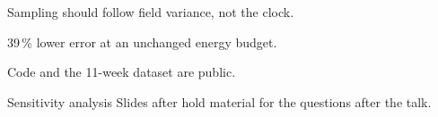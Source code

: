 \documentclass[aspectratio=169,10pt]{beamer}
\begin{document}
\begin{closing}
  \item Sampling should follow field variance, not the clock.
  \item 39\,\% lower error at an unchanged energy budget.
  \item Code and the 11-week dataset are public.
\end{closing}

\thbbackup
\begin{frame}{Sensitivity analysis}
  Slides after  hold material for the questions after the talk.
\end{frame}
\end{document}
